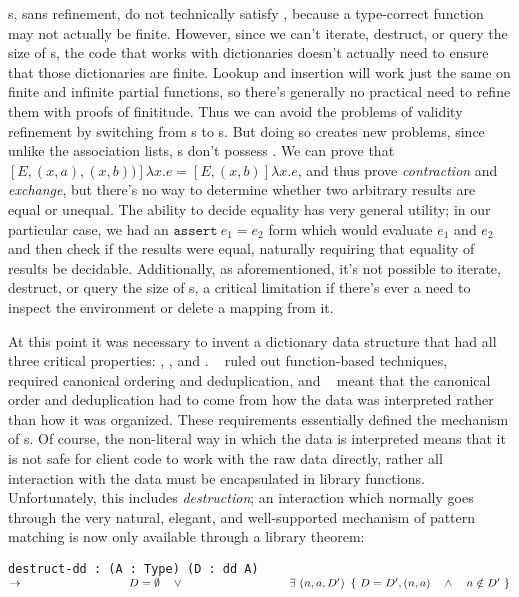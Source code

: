 {\FPF}s, sans refinement, do not technically satisfy \SemTot, because a type-correct function may not
actually be finite. However, since we can't iterate, destruct, or query the size of {\FPF}s, the code
that works with dictionaries doesn't actually need to ensure that those dictionaries are finite. Lookup
and insertion will work just the same on finite and infinite partial functions, so there's generally no
practical need to refine them with proofs of finititude. Thus we can avoid the problems of validity refinement
by switching from {\CAL}s to {\FPF}s. But doing so creates new problems, since unlike the association lists,
{\FPF}s don't possess \EqDec. We can prove that
\mbox{$[E, (x, a), (x, b))]\lambda x . e = [E, (x, b)]\lambda x . e$}, and thus prove \emph{contraction} and
\emph{exchange}, but there's no way to determine whether two arbitrary results are equal or unequal.
The ability to decide equality has very general utility; in our particular case, we had an
\mbox{$\texttt{assert}~ e_1 = e_2$} form which would evaluate $e_1$ and $e_2$ and then check if the results
were equal, naturally requiring that equality of results be decidable. Additionally, as aforementioned,
it's not possible to iterate, destruct, or query the size of {\FPF}s, a critical limitation if there's
ever a need to inspect the environment or delete a mapping from it.

At this point it was necessary to invent a dictionary data structure that had all three critical properties:
\SemTot, \SemInj, and \EqDec. \EqDec~ ruled out function-based techniques, \SemInj~ required canonical
ordering and deduplication, and \SemTot~ meant that the canonical order and deduplication had to come from
how the data was interpreted rather than how it was organized. These requirements essentially defined the
mechanism of {\dd}s. Of course, the non-literal way in which the data is interpreted means that it is not
safe for client code to work with the raw data directly, rather all interaction with the data must be
encapsulated in library functions. Unfortunately, this includes \emph{destruction}; an interaction which
normally goes through the very natural, elegant, and well-supported mechanism of pattern matching is now
only available through a library theorem:

\texttt{destruct-dd : (A : Type) (D : dd A) $\rightarrow \\
\phantom{xxxxxxxxxxxxxxxx} D = \emptyset \quad \lor \\
\phantom{xxxxxxxxxxxxxxxx} \exists~(n, a, D')~\left\{~ D = D' , (n, a) \quad \land \quad n \notin D' ~\right\}$}

